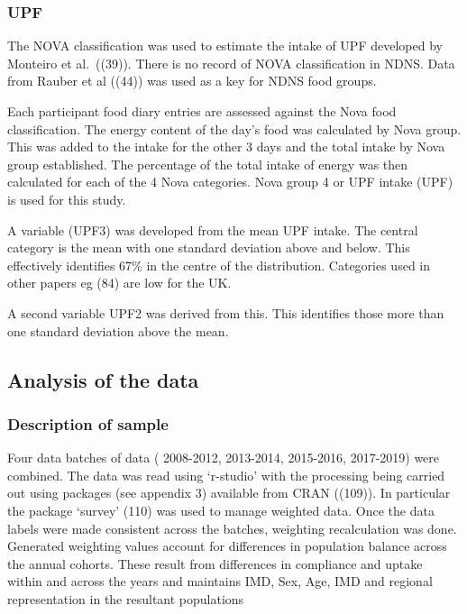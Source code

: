\documentclass[
]{article}
\begin{document}
\hypertarget{upf-1}{%
\subsubsection{UPF}\label{upf-1}}

The NOVA classification was used to estimate the intake of UPF developed
by Monteiro et al.~((39)). There is no record of NOVA classification in
NDNS. Data from Rauber et al ((44)) was used as a key for NDNS food
groups.

Each participant food diary entries are assessed against the Nova food
classification. The energy content of the day's food was calculated by
Nova group. This was added to the intake for the other 3 days and the
total intake by Nova group established. The percentage of the total
intake of energy was then calculated for each of the 4 Nova categories.
Nova group 4 or UPF intake (UPF) is used for this study.

A variable (UPF3) was developed from the mean UPF intake. The central
category is the mean with one standard deviation above and below. This
effectively identifies 67\% in the centre of the distribution.
Categories used in other papers eg (84) are low for the UK.

A second variable UPF2 was derived from this. This identifies those more
than one standard deviation above the mean.

\hypertarget{analysis-of-the-data}{%
\subsection{Analysis of the data}\label{analysis-of-the-data}}

\hypertarget{description-of-sample}{%
\subsubsection{Description of sample}\label{description-of-sample}}

Four data batches of data ( 2008-2012, 2013-2014, 2015-2016, 2017-2019)
were combined. The data was read using `r-studio' with the processing
being carried out using packages (see appendix 3) available from CRAN
((109)). In particular the package `survey' (110) was used to manage
weighted data. Once the data labels were made consistent across the
batches, weighting recalculation was done. Generated weighting values
account for differences in population balance across the annual cohorts.
These result from differences in compliance and uptake within and across
the years and maintains IMD, Sex, Age, IMD and regional representation
in the resultant populations
\end{document}
